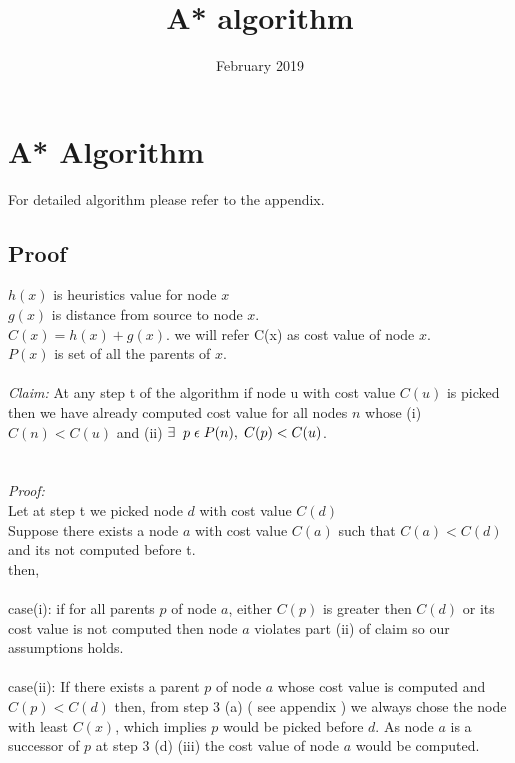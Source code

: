 \documentclass{article}
\title{A* algorithm}
\date{February 2019}
\begin{document}

\section{A* Algorithm}
For detailed algorithm please refer to the appendix.
\subsection{Proof}
$h(x) $ is heuristics value for node $x$\\
$g(x) $ is distance from source to node $x$.\\
$C(x) = h(x) + g(x). $ we will refer C(x) as cost value of node $x$.\\
$P(x) $ is set of all the parents of $x$.\\
\\
\textit{Claim:} At any step t of the algorithm if node u with cost value $C(u)$ is picked then we have already computed cost value for all nodes $n$ whose (i) $C(n) < C(u)$ and  (ii) $\exists \hspace{2mm} p \hspace{1mm} \epsilon \hspace{1mm} P(n),\hspace{1mm} C(p) < C(u)$.\\
\\
\\
\textit{Proof:}\\
Let at step t we picked node $d$ with cost value $C(d)$\\
Suppose there exists a node $a$ with cost value $C(a)$ such that $C(a)< C(d)$ and its not computed before t.\\
then,
\\
\\
case(i): if for all parents $p$ of node $a$, either $C(p)$ is greater then $C(d)$ or its cost value is not computed then node $a$ violates part (ii) of claim so our assumptions holds.  
\\
\\
case(ii): If there exists a parent $p$ of node $a$ whose cost value is computed and  $C(p) < C(d) $ then, from step  3 (a) ( see appendix ) we always chose the node with least $C(x)$, which implies $p$ would be picked before $d$. As node $a$ is a successor of $p$ at step 3 (d) (iii) the cost value of node $a$ would be computed.\\
\end{document}
